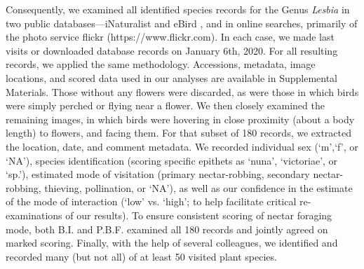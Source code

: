 \documentclass[fleqn,10pt,lineno]{wlpeerj}
\begin{document}
Consequently, we examined all identified species records for the Genus \textit{Lesbia} in two public databases---iNaturalist \citep{inaturalist} and eBird \citep{ebird}, and in online searches, primarily of the photo service flickr (https://www.flickr.com). In each case, we made last visits or downloaded database records on January 6th, 2020. 
For all resulting records, we applied the same methodology. 
Accessions, metadata, image locations, and scored data used in our analyses are available in Supplemental Materials.
Those without any flowers were discarded, as were those in which birds were simply perched or flying near a flower.
We then closely examined the remaining images, in which birds were hovering in close proximity (about a body length) to flowers, and facing them. 
For that subset of 180 records, we extracted the location, date, and comment metadata. 
We recorded individual sex (`m',`f', or `NA'), species identification (scoring specific epithets as `nuna', `victoriae', or `sp.'), estimated mode of visitation (primary nectar-robbing, secondary nectar-robbing, thieving, pollination, or `NA'), as well as our confidence in the estimate of the mode of interaction (`low' vs. `high'; to help facilitate critical re-examinations of our results). 
To ensure consistent scoring of nectar foraging mode, both B.I. and P.B.F. examined all 180 records and jointly agreed on marked scoring.
Finally, with the help of several colleagues, we identified and recorded many (but not all) of at least 50 visited plant species. 
\end{document}
